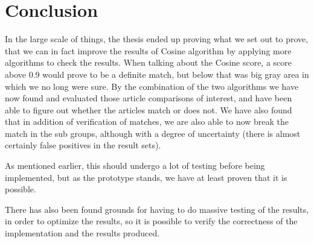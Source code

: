 \chapter{Conclusion}
In the large scale of things, the thesis ended up proving what we set out to prove, that we can in fact improve the results of Cosine algorithm by applying more algorithms to check the results. When talking about the Cosine score, a score above 0.9 would prove to be a definite match, but below that was big gray area in which we no long were sure. By the combination of the two algorithms we have now found and evaluated those article comparisons of interest, and have been able to figure out whether the articles match or does not. We have also found that in addition of verification of matches, we are also able to now break the match in the sub groups, although with a degree of uncertainty (there is almost certainly false positives in the result sets). 

As mentioned earlier, this should undergo a lot of testing before being implemented, but as the prototype stands, we have at least proven that it is possible.

There has also been found grounds for having to do massive testing of the results, in order to optimize the results, so it is possible to verify the correctness of the implementation and the results produced.